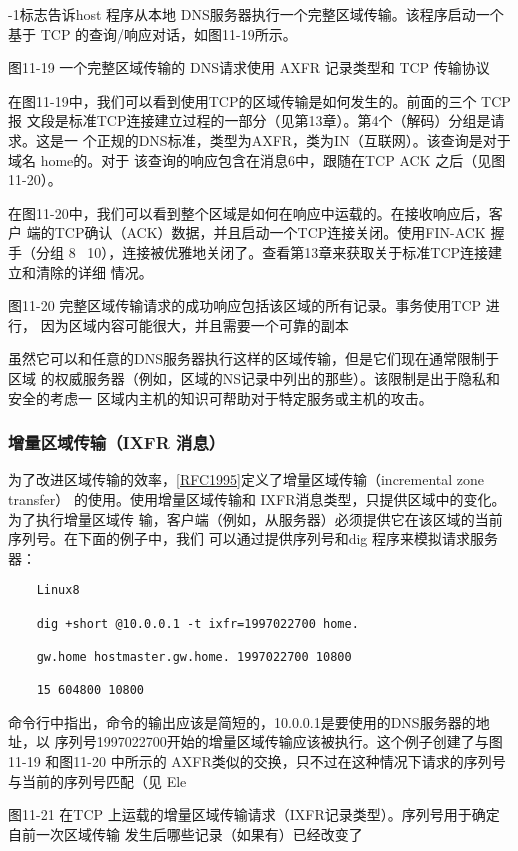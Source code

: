 -1标志告诉host 程序从本地 DNS服务器执行一个完整区域传输。该程序启动一个基于 TCP
的查询/响应对话，如图11-19所示。

图11-19 一个完整区域传输的 DNS请求使用 AXFR 记录类型和 TCP 传输协议

在图11-19中，我们可以看到使用TCP的区域传输是如何发生的。前面的三个 TCP报
文段是标准TCP连接建立过程的一部分（见第13章）。第4个（解码）分组是请求。这是一
个正规的DNS标准，类型为AXFR，类为IN（互联网）。该查询是对于域名 home的。对于
该查询的响应包含在消息6中，跟随在TCP ACK 之后（见图11-20）。

在图11-20中，我们可以看到整个区域是如何在响应中运载的。在接收响应后，客户
端的TCP确认（ACK）数据，并且启动一个TCP连接关闭。使用FIN-ACK 握手（分组
8 ~10），连接被优雅地关闭了。查看第13章来获取关于标准TCP连接建立和清除的详细
情况。

图11-20
完整区域传输请求的成功响应包括该区域的所有记录。事务使用TCP 进行，
因为区域内容可能很大，并且需要一个可靠的副本

虽然它可以和任意的DNS服务器执行这样的区域传输，但是它们现在通常限制于区域
的权威服务器（例如，区域的NS记录中列出的那些）。该限制是出于隐私和安全的考虑一
区域内主机的知识可帮助对于特定服务或主机的攻击。

\subsubsection{增量区域传输（IXFR 消息）}

为了改进区域传输的效率，\href{https://www.rfc-editor.org/rfc/rfc1995}{[RFC1995]}定义了增量区域传输（incremental zone transfer）
的使用。使用增量区域传输和 IXFR消息类型，只提供区域中的变化。为了执行增量区域传
输，客户端（例如，从服务器）必须提供它在该区域的当前序列号。在下面的例子中，我们
可以通过提供序列号和dig 程序来模拟请求服务器：

\begin{verbatim}
    Linux8
    
    dig +short @10.0.0.1 -t ixfr=1997022700 home.
    
    gw.home hostmaster.gw.home. 1997022700 10800
    
    15 604800 10800
\end{verbatim}

命令行中指出，命令的输出应该是简短的，10.0.0.1是要使用的DNS服务器的地址，以
序列号1997022700开始的增量区域传输应该被执行。这个例子创建了与图11-19 和图11-20
中所示的 AXFR类似的交换，只不过在这种情况下请求的序列号与当前的序列号匹配（见
Ele

图11-21
在TCP 上运载的增量区域传输请求（IXFR记录类型）。序列号用于确定自前一次区域传输
发生后哪些记录（如果有）已经改变了

